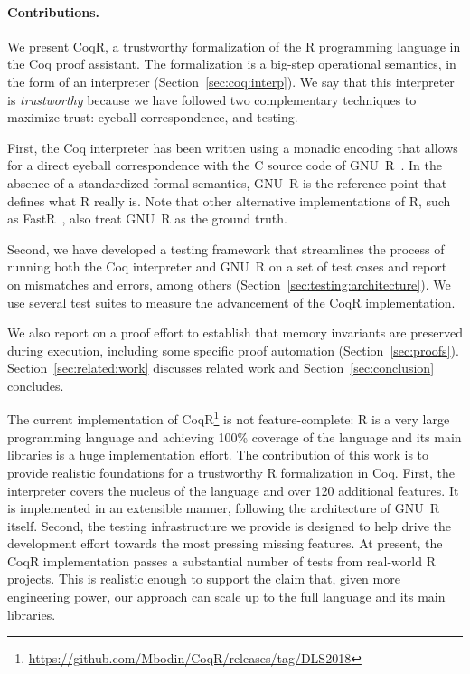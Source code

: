 \documentclass[
    sigplan,
    10pt,
    review, %
    natbib=false %
 ]{acmart}
\newcommand\et[1]{\todo[color=blue!20,size=\scriptsize]{#1}}
\newcommand\CoqR{CoqR}
\begin{document}
\paragraph{Contributions.}
We present \CoqR{}, a trustworthy formalization of the R programming language in the Coq proof assistant.
The formalization is a big-step operational semantics, in the form of an interpreter (Section~\ref{sec:coq:interp}).
%
We say that this interpreter is {\em trustworthy} because we have followed two complementary techniques to maximize trust: eyeball correspondence, and testing.

First, the Coq interpreter has been written using a monadic encoding that allows for a direct eyeball correspondence with the C source code of GNU~R~\parencite{Rwebsite}. In the absence of a standardized formal semantics, GNU~R is the reference point that defines what R really is. Note that other alternative implementations of R, such as FastR~\parencite{kalibera2014fast}, also treat GNU~R as the ground truth.

Second, we have developed a testing framework that streamlines the process of running both the Coq interpreter and GNU~R on a set of test cases and report on mismatches and errors, among others (Section~\ref{sec:testing:architecture}). We use several test suites to measure the advancement of the \CoqR{} implementation.

We also report on a proof effort to establish that memory invariants are preserved during execution, including some specific proof automation (Section~\ref{sec:proofs}).
%
Section~\ref{sec:related:work} discusses related work and Section~\ref{sec:conclusion} concludes.


The current implementation of \CoqR{}\footnote{\url{https://github.com/Mbodin/CoqR/releases/tag/DLS2018}} is not feature-complete:
R is a very large programming language and achieving 100\% coverage of the language and its main libraries is a huge implementation effort.
The contribution of this work is to provide realistic foundations for a trustworthy R formalization in Coq.
First, the interpreter covers the nucleus of the language and over 120 additional features. It is implemented in an extensible manner, following the architecture of GNU~R itself. Second, the testing infrastructure we provide is designed to help drive the development effort towards the most pressing missing features. At present, the \CoqR{} implementation passes a substantial number of tests from real-world R projects. This is realistic enough to support the claim that, given more engineering power, our approach can scale up to the full language and its main libraries.
\end{document}
